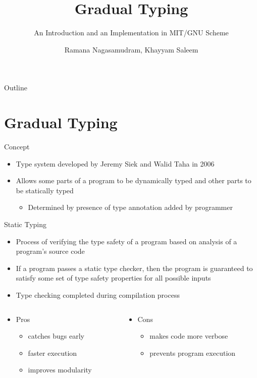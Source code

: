 \documentclass[presentation]{beamer}
\author{Ramana Nagasamudram, Khayyam Saleem}
\date{}
\title{Gradual Typing}
\subtitle{An Introduction and an Implementation in MIT/GNU Scheme}
\institute[CS810]{CS810 -- Type Systems for Programming Languages}
\begin{document}
\maketitle
\begin{frame}{Outline}
\tableofcontents
\end{frame}



\section{Gradual Typing}
\label{sec:orgdf9c309}
\begin{frame}[label={sec:orga259e2e}]{Concept}
\begin{itemize}
\item Type system developed by Jeremy Siek and Walid Taha in 2006
\item Allows some parts of a program to be dynamically typed and other parts to be statically typed
\begin{itemize}
\item Determined by presence of type annotation added by programmer
\end{itemize}
\end{itemize}
\end{frame}
\begin{frame}[label={sec:orgc925b5e}]{Static Typing}
\begin{itemize}
\item Process of verifying the type safety of a program based on analysis of a program's source code
\item If a program passes a static type checker, then the program is guaranteed to satisfy some set of type safety properties for all possible inputs
\item Type checking completed during compilation process
\end{itemize}



\begin{columns}
\begin{column}{0.5\columnwidth}
\begin{itemize}
\item Pros
\begin{itemize}
\item catches bugs early
\item faster execution
\item improves modularity
\end{itemize}
\end{itemize}
\end{column}


\begin{column}{0.5\columnwidth}
\begin{itemize}
\item Cons
\begin{itemize}
\item makes code more verbose
\item prevents program execution
\end{itemize}
\end{itemize}
\end{column}
\end{columns}
\end{frame}
\end{document}
